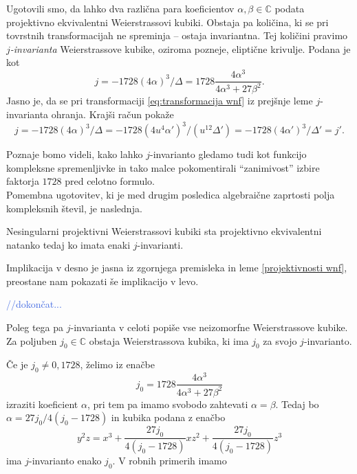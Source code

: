 \documentclass[mat1]{fmfdelo}
\newcommand{\C}{\mathbb C}
\newcommand{\kom}[1]{
    \textcolor{RoyalBlue}{//#1}
}
\theoremstyle{definition}
\begin{document}
Ugotovili smo, da lahko dva različna para koeficientov $\alpha, \beta \in \C$ podata projektivno ekvivalentni Weierstrassovi kubiki. Obstaja pa količina, ki se pri tovrstnih transformacijah ne spreminja -- ostaja invariantna. Tej količini pravimo \emph{$j$-invarianta} Weierstrassove kubike, oziroma pozneje, eliptične krivulje. Podana je kot 
\[
    j = -1728(4\alpha)^3/\Delta = 1728\frac{4\alpha^3}{4\alpha^3 + 27\beta^2}.  
\] 
Jasno je, da se pri transformaciji \eqref{eq:transformacija wnf} iz prejšnje leme $j$-invarianta ohranja. Krajši račun pokaže
\[
    j = -1728(4\alpha)^3/\Delta = -1728(4u^4\alpha')^3/(u^{12}\Delta') = -1728(4\alpha')^3/\Delta' = j'.
\]

Poznaje bomo videli, kako lahko $j$-invarianto gledamo tudi kot funkcijo kompleksne spremenljivke in tako malce pokomentirali ``zanimivost'' izbire faktorja $1728$ pred celotno formulo.
\\

Pomembna ugotovitev, ki je med drugim posledica algebraične zaprtosti polja kompleksnih števil, je naslednja. 

\begin{trditev}
    Nesingularni projektivni Weierstrassovi kubiki sta projektivno ekvivalentni natanko tedaj ko imata enaki $j$-invarianti.
\end{trditev}

\begin{dokaz}
    Implikacija v desno je jasna iz zgornjega premisleka in leme \ref{projektivnosti wnf}, preostane nam pokazati še implikacijo v levo. 

    \kom{dokončat...}
\end{dokaz}

Poleg tega pa $j$-invarianta v celoti popiše vse neizomorfne Weierstrassove kubike. Za poljuben $j_0 \in \C$ obstaja Weierstrassova kubika, ki ima $j_0$ za svojo $j$-invarianto.

Če je $j_0 \neq 0, 1728$, želimo iz enačbe
\[
    j_0 = 1728\frac{4\alpha^3}{4\alpha^3 + 27\beta^2}  
\]
izraziti koeficient $\alpha$, pri tem pa imamo svobodo zahtevati $\alpha = \beta$. Tedaj bo $\alpha = 27j_0/4(j_0 - 1728)$ in kubika podana z enačbo 
\[
  y^2z = x^3 + \frac{27j_0}{4(j_0 - 1728)}xz^2 + \frac{27j_0}{4(j_0 - 1728)}z^3
\] 
ima $j$-invarianto enako $j_0$. V robnih primerih imamo
\end{document}
